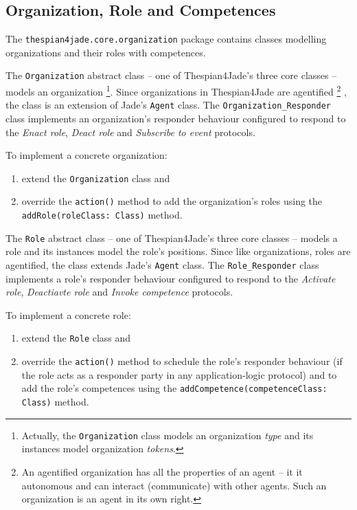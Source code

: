 \subsection{Organization, Role and Competences}

The \texttt{thespian4jade.core.organization} package contains classes modelling organizations and their roles with competences.

The \texttt{Organization} abstract class -- one of Thespian4Jade's three core classes -- models an organization
\footnote{Actually, the \texttt{Organization} class models an organization \textit{type} and its instances model organization \textit{tokens}.}.
Since organizations in Thespian4Jade are agentified
\footnote{An agentified organization has all the properties of an agent -- it it autonomous and can interact (communicate) with other agents. Such an organization is an agent in its own right.}
, the class is an extension of Jade's \texttt{Agent} class.
The \texttt{Organization\_Responder} class implements an organization's responder behaviour configured to respond to the \textit{Enact role}, \textit{Deact role} and \textit{Subscribe to event} protocols.

To implement a concrete organization:
\begin{enumerate}
	\item extend the \texttt{Organization} class and
	\item override the \texttt{action()} method to add the organization's roles using the \texttt{addRole(roleClass: Class)} method.	
\end{enumerate}

The \texttt{Role} abstract class -- one of Thespian4Jade's three core classes -- models a role and its instances model the role's positions.
Since like organizations, roles are agentified, the class extends Jade's \texttt{Agent} class.
The \texttt{Role\_Responder} class implements a role's responder behaviour configured to respond to the \textit{Activate role}, \textit{Deactiavte role} and \textit{Invoke competence} protocols.

To implement a concrete role:
\begin{enumerate}
	\item extend the \texttt{Role} class and
	\item override the \texttt{action()} method to schedule the role's responder behaviour (if the role acts as a responder party in any application-logic protocol) and to add the role's competences using the \texttt{addCompetence(competenceClass: Class)} method.	
\end{enumerate}

